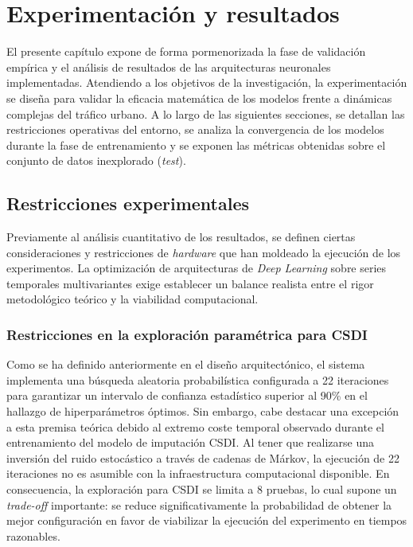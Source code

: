 \chapter{Experimentación y resultados}
\label{cap:experimentacion}

El presente capítulo expone de forma pormenorizada la fase de validación empírica y el análisis de resultados de las arquitecturas neuronales implementadas. Atendiendo a los objetivos de la investigación, la experimentación se diseña para validar la eficacia matemática de los modelos frente a dinámicas complejas del tráfico urbano. A lo largo de las siguientes secciones, se detallan las restricciones operativas del entorno, se analiza la convergencia de los modelos durante la fase de entrenamiento y se exponen las métricas obtenidas sobre el conjunto de datos inexplorado (\textit{test}).





\section{Restricciones experimentales}
\label{sec:experimental_design}

Previamente al análisis cuantitativo de los resultados, se definen ciertas consideraciones y restricciones de \textit{hardware} que han moldeado la ejecución de los experimentos. La optimización de arquitecturas de \textit{Deep Learning} sobre series temporales multivariantes exige establecer un balance realista entre el rigor metodológico teórico y la viabilidad computacional.

\subsection{Restricciones en la exploración paramétrica para CSDI}

Como se ha definido anteriormente en el diseño arquitectónico, el sistema implementa una búsqueda aleatoria probabilística configurada a 22 iteraciones para garantizar un intervalo de confianza estadístico superior al 90\% en el hallazgo de hiperparámetros óptimos. Sin embargo, cabe destacar una excepción a esta premisa teórica debido al extremo coste temporal observado durante el entrenamiento del modelo de imputación CSDI. Al tener que realizarse una inversión del ruido estocástico a través de cadenas de Márkov, la ejecución de 22 iteraciones no es asumible con la infraestructura computacional disponible. En consecuencia, la exploración para CSDI se limita a 8 pruebas, lo cual supone un \textit{trade-off} importante: se reduce significativamente la probabilidad de obtener la mejor configuración en favor de viabilizar la ejecución del experimento en tiempos razonables.

